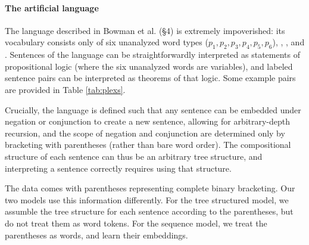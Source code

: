 \paragraph{The artificial language} The language described in Bowman et al. (\S4) is extremely impoverished: its vocabulary consists only of six unanalyzed word types ($p_1, p_2, p_3, p_4, p_5, p_6$), , , and . Sentences of the language can be straightforwardly interpreted as statements of propositional logic (where the six unanalyzed words are variables), and labeled sentence pairs can be interpreted as theorems of that logic. Some example pairs are provided in Table \ref{tab:plexs}.

Crucially, the language is defined such that any sentence can be embedded under negation or conjunction to create a new sentence, allowing for arbitrary-depth recursion, and the scope of negation and conjunction are determined only by bracketing with parentheses (rather than bare word order). The compositional structure of each sentence can thus be an arbitrary tree structure, and interpreting a sentence correctly requires using that structure.

The data comes with parentheses representing complete binary bracketing. Our two models use this information differently. For the tree structured model, we assumble the tree structure for each sentence according to the parentheses, but do not treat them as word tokens. For the sequence model, we treat the parentheses as words, and learn their embeddings.

